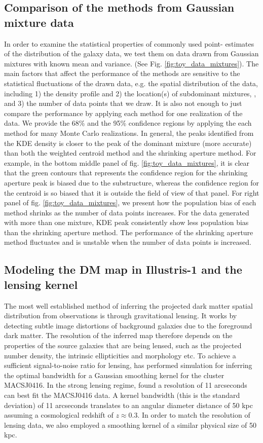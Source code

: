 \subsection{Comparison of the methods from Gaussian mixture data}
In order to examine the statistical properties of commonly used point-
estimates of the distribution of the galaxy data, we test them on data drawn 
from Gaussian mixtures with known mean and variance. (See Fig.
\ref{fig:toy_data_mixtures}). The main factors that affect the performance of 
the methods are sensitive to the statistical fluctuations of the drawn data, 
e.g. the
spatial distribution of the data, including 1) the density profile and 2) the
location(s) of subdominant mixtures,
, and 3) the number of data points that we draw.
It is also not enough to just
compare the performance by applying each method for one realization of the
data. We provide the 68\% and the 95\% confidence regions by applying the
each method for many Monte Carlo realizations.
In general, the peaks identified from the KDE density is closer to the 
peak of the dominant mixture (more accurate) than 
both the weighted centroid method and the shrinking aperture method.
For example, in the bottom middle panel of fig. \ref{fig:toy_data_mixtures}, 
it is clear that the green contours
that represents the confidence region for the shrinking aperture peak is
biased due to the substructure, whereas the confidence region for the centroid 
is so biased that it is outside the field of view of that panel.
For right panel of fig. \ref{fig:toy_data_mixtures}, 
we present how the population bias of each method shrinks as the
number of data points increases. For the data generated with more than one mixture, 
KDE peak consistently show less population bias than the shrinking aperture method. 
The performance of the shrinking aperture method fluctuates and is unstable when
the number of data points is increased.

\subsection{Modeling the DM map in Illustris-1 and the lensing kernel}
The most well established method of inferring the projected dark matter spatial 
distribution from observations is through gravitational lensing.
It works by detecting subtle image distortions of background galaxies due to
the foreground dark matter. The resolution of the inferred map therefore 
depends on the properties of the source galaxies that are being lensed, 
such as the projected number density, the intrinsic ellipticities and morphology etc.
To achieve a sufficient signal-to-noise ratio for lensing, 
\cite{Hoag2016} has performed simulation for inferring the optimal bandwidth
for a Gaussian smoothing kernel for the cluster MACSJ0416. 
In the strong lensing regime, \cite{Hoag2016} found a resolution of 11 arcseconds
can best fit the MACSJ0416 data. A kernel bandwidth (this is the standard deviation) 
of 11 arcseconds translates to an angular diameter distance of 50 
kpc assuming a cosmological redshift of $z \approx 0.3$. 
In order to match the resolution of lensing data,
we also employed a smoothing kernel of a similar physical size of 50 kpc.  


